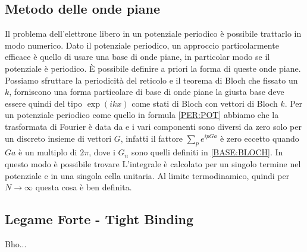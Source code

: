 \documentclass[a4paper,12pt]{article}
\begin{document}
\subsection{Metodo delle onde piane}
Il problema dell'elettrone libero in un potenziale periodico è possibile trattarlo in modo numerico. Dato il potenziale periodico, un approccio particolarmente efficace è quello di usare una base di onde piane, in particolar modo se il potenziale è periodico. \`E possibile definire a priori la forma di queste onde piane. Possiamo sfruttare la periodicità del reticolo e il teorema di Bloch che fissato un $k$, forniscono una forma particolare di base di onde piane
la giusta base deve essere quindi del tipo $\exp(ikx)$ come stati di Bloch con vettori di Bloch $k$. Per un potenziale periodico come quello in formula \ref{PER:POT} abbiamo che la trasformata di Fourier è data da
e i vari componenti sono diversi da zero solo per un discreto insieme di vettori $G$, infatti il fattore $\sum_pe^{ipGa}$ è zero eccetto quando $Ga$ è un multiplo di $2\pi$, dove i $G_n$ sono quelli definiti in \ref{BASE:BLOCH}. In questo modo è possibile trovare
L'integrale è calcolato per un singolo termine nel potenziale e in una singola cella unitaria. Al limite termodinamico, quindi per $N\to\infty$ questa cosa è ben definita.

\subsection{Legame Forte - Tight Binding}
Bho...
\end{document}
